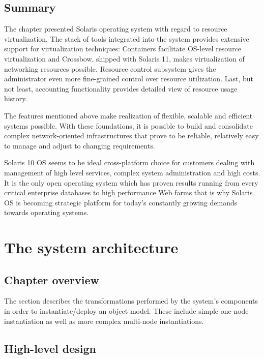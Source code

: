 \documentclass[11pt]{book}
\begin{document}
    \section*{Summary}

      The chapter presented Solaris operating system with regard to resource virtualization. The stack of tools
      integrated into the system provides extensive support for virtualization techniques: Containers facilitate
      OS-level resource virtualization and Crossbow, shipped with Solaris 11, makes virtualization of networking
      resources possible. Resource control subsystem gives the administrator even more fine-grained control over
      resource utilization. Last, but not least, accounting functionality provides detailed view of resource usage
      history.

      The features mentioned above make realization of flexible, scalable and efficient systems possible. With these
      foundations, it is possible to build and consolidate complex network-oriented infrastructures that prove to be
      reliable, relatively easy to manage and adjust to changing requirements.

      Solaris 10 OS seems to be ideal cross-platform choice for customers dealing with management of high level
      services, complex system administration and high costs. It is the only open operating system which has proven
      results running from every critical enterprise databases to high performance Web farms that is why Solaris OS is
      becoming strategic platform for today's constantly growing demands towards operating systems. 


  \chapter{The system architecture}

    \section*{Chapter overview}

      The  section describes the transformations performed by the system's components in order
      to instantiate/deploy an object model. These include simple one-node instantiation as well as more complex
      multi-node instantiations.



    \section{High-level design}
\end{document}
